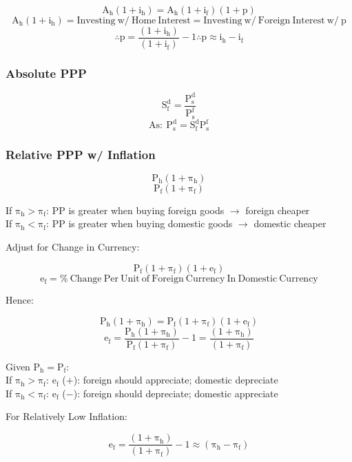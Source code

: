 \documentclass[11pt, english]{article}
\begin{document}
	$$\mathrm{A_h(1+i_h)=A_h(1+i_f)(1+p)}$$
	$$\mathrm{A_h(1+i_h)=Investing\ w/\ Home\ Interest=Investing\ w/\ Foreign\ Interest\ w/\ p}$$
	$$\mathrm{\therefore p=\frac{(1+i_h)}{(1+i_f)}-1\therefore p\approx i_h-i_f}$$

		\subsubsection{Absolute PPP}

	$$\mathrm{S_f^d=\frac{P_s^d}{P_s^f}}$$
	$$\mathrm{As:\ P_s^d=S_f^dP_s^f}$$

		\subsubsection{Relative PPP w/ Inflation}

	$$\mathrm{P_h(1+\pi_h)}$$
	$$\mathrm{P_f(1+\pi_f)}$$

	\begin{center}
	If $\mathrm{\pi_h>\pi_f}$: PP is greater when buying foreign goods $\rightarrow$ foreign cheaper\\
	If $\mathrm{\pi_h<\pi_f}$: PP is greater when buying domestic goods $\rightarrow$
domestic cheaper
	\end{center}

	\begin{center}Adjust for Change in Currency:\end{center}
	$$\mathrm{P_f(1+\pi_f)(1+e_f)}$$
	$$\mathrm{e_f=\%\ Change\ Per\ Unit\ of\ Foreign\ Currency\ In\ Domestic\ Currency}$$

	\begin{center}Hence:\end{center}
	$$\mathrm{P_h(1+\pi_h)=P_f(1+\pi_f)(1+e_f)}$$
	$$\mathrm{e_f=\frac{P_h(1+\pi_h)}{P_f(1+\pi_f)}-1=\frac{(1+\pi_h)}{(1+\pi_f)}}$$

	\begin{center}Given $\mathrm{P_h=P_f}$:\\
	If $\mathrm{\pi_h>\pi_f}$: $\mathrm{e_f}$ ($+$): foreign should appreciate; domestic depreciate\\
	If $\mathrm{\pi_h<\pi_f}$: $\mathrm{e_f}$ ($-$): foreign should depreciate; domestic appreciate
	\end{center}

	\begin{center}For Relatively Low Inflation:\end{center}
	$$\mathrm{e_f=\frac{(1+\pi_h)}{(1+\pi_f)}-1\approx(\pi_h-\pi_f)}$$
\end{document}
